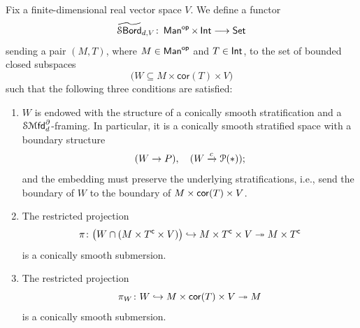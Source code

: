 \begin{definition}\label{ch5:: def: bord_d strat}
    Fix a finite-dimensional real vector space $V$. We define a functor 
    \begin{equation}
    \operatorname{\widetilde{\mathcal S\mathsf{Bord}}}_{d,V}\colon \operatorname{\sf Man}^{\mathsf{op}}\times \operatorname{\mathsf{Int}} \longrightarrow \operatorname{{\mathsf{Set}}}    
    \end{equation}
    sending a pair $(M,T)$, where $M\in \operatorname{\sf Man}^{\mathsf{op}}$ and $T\in \operatorname{\mathsf{Int}}$, to the set of bounded closed subspaces 
    \begin{equation}
   \big( W\subseteq M\times \mathsf{cor}(T) \times V \big)
    \end{equation} 
    such that the following three conditions are satisfied:
    \begin{enumerate}
    \item \label{id: st 1} $W$ is endowed with the structure of a conically smooth stratification and a ${\mathcal S\!\operatorname{{\mathcal M}\mathsf{fd}}}_{d}^{\partial}$-framing. In particular, it is a conically smooth stratified space with a boundary structure
    \begin{equation}
         (W \rightarrow P),\quad (W \xrightarrow{c} \mathcal P(*));
    \end{equation} 
    and the embedding must preserve the underlying stratifications, i.e., send the boundary of $W$ to the boundary of $M\times \operatorname{{\sf cor}}(T) \times V$.
    \item \label{id: st 2} The restricted projection 
    \begin{equation}
        \pi\colon \big(W \cap (M\times T^{\mathsf c} \times V) \big) \hookrightarrow  M \times T^{\mathsf c} \times V \twoheadrightarrow  M \times T^{\mathsf c}
    \end{equation} 
    is a conically smooth submersion.
    \item \label{id: st 3} The restricted projection 
    \begin{equation}
    \pi_W\colon W \hookrightarrow M\times \mathsf{cor}(T) \times V \twoheadrightarrow M 
    \end{equation}
    is a conically smooth submersion.
    \end{enumerate} 


\end{definition}
